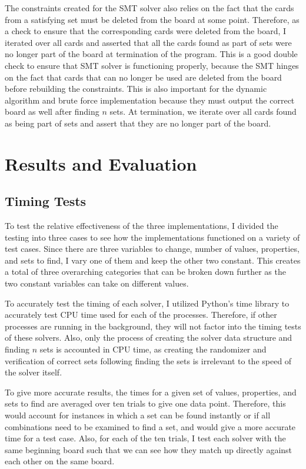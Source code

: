 \documentclass[pageno]{jpaper}
\begin{document}
The constraints created for the SMT solver also relies on the fact that the cards from a satisfying set must be deleted from the board at some point. Therefore, as a check to ensure that the corresponding cards were deleted from the board, I iterated over all cards and asserted that all the cards found as part of sets were no longer part of the board at termination of the program. This is a good double check to ensure that SMT solver is functioning properly, because the SMT hinges on the fact that cards that can no longer be used are deleted from the board before rebuilding the constraints. This is also important for the dynamic algorithm and brute force implementation because they must output the correct board as well after finding $n$ sets. At termination, we iterate over all cards found as being part of sets and assert that they are no longer part of the board.

\section{Results and Evaluation}

\subsection{Timing Tests}

To test the relative effectiveness of the three implementations, I divided the testing into three cases to see how the implementations functioned on a variety of test cases. Since there are three variables to change, number of values, properties, and sets to find, I vary one of them and keep the other two constant. This creates a total of three overarching categories that can be broken down further as the two constant variables can take on different values. 

To accurately test the timing of each solver, I utilized Python's time library to accurately test CPU time used for each of the processes. Therefore, if other processes are running in the background, they will not factor into the timing tests of these solvers. Also, only the process of creating the solver data structure and finding $n$ sets is accounted in CPU time, as creating the randomizer and verification of correct sets following finding the sets is irrelevant to the speed of the solver itself. 

To give more accurate results, the times for a given set of values, properties, and sets to find are averaged over ten trials to give one data point. Therefore, this would account for instances in which a set can be found instantly or if all combinations need to be examined to find a set, and would give a more accurate time for a test case. Also, for each of the ten trials, I test each solver with the same beginning board such that we can see how they match up directly against each other on the same board.
\end{document}
